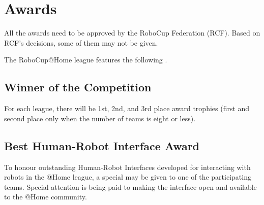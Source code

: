 \section{Awards}
\label{sec:awards}
All the awards need to be approved by the RoboCup Federation (RCF). Based on RCF's decisions, some of them may not be given.

The RoboCup@Home league features the following .

\subsection{Winner of the Competition}
\label{award:winner}
For each league, there will be 1st, 2nd, and 3rd place award trophies (first 
and second place only when the number of teams is eight or less).

%
%
%
%


%
%
\subsection{Best Human-Robot Interface Award}
\label{award:hri}
To honour outstanding Human-Robot Interfaces developed for interacting with 
robots in the @Home league, a special  may be 
given to one of the participating teams. Special attention is being paid to 
making the interface open and available to the @Home community.

